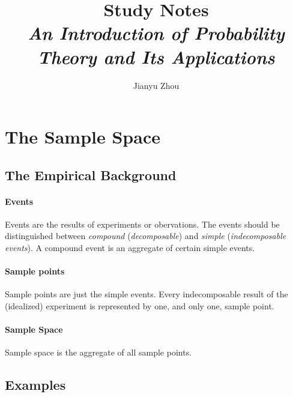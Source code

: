 \documentclass{article}
\author{Jianyu Zhou}
\title{\textbf{Study Notes}\\ \textit{An Introduction of Probability Theory and Its Applications}}
\numberwithin{equation}{subsection}
\begin{document}
	\maketitle
	\tableofcontents
	\newpage
	\section{The Sample Space}
		\subsection{The Empirical Background}
			\paragraph{Events} Events are the results of experiments or obervations. The events should be distinguished between \textit{compound} (\textit{decomposable}) and \textit{simple} (\textit{indecomposable events}). A compound event is an aggregate of certain simple events.
			\paragraph{Sample points} Sample points are just the simple events. Every indecomposable result of the (idealized) experiment is represented by one, and only one, sample point.
			\paragraph{Sample Space} Sample space is the aggregate of all sample points.
		\subsection{Examples}
\end{document}

